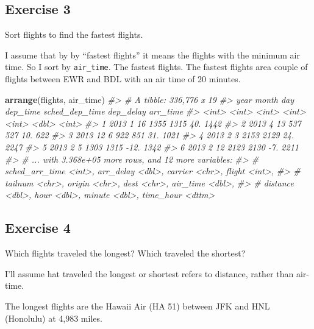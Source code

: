 \documentclass[]{book}
\newenvironment{Shaded}{\begin{snugshade}}{\end{snugshade}}
\newcommand{\CommentTok}[1]{\textcolor[rgb]{0.56,0.35,0.01}{\textit{#1}}}
\newcommand{\KeywordTok}[1]{\textcolor[rgb]{0.13,0.29,0.53}{\textbf{#1}}}
\newcommand{\NormalTok}[1]{#1}
\theoremstyle{definition}
\theoremstyle{definition}
\theoremstyle{definition}
\theoremstyle{remark}
\begin{document}
\hypertarget{exercise-3-2}{%
\subsection{Exercise 3}\label{exercise-3-2}}

Sort flights to find the fastest flights.

I assume that by by ``fastest flights'' it means the flights with the
minimum air time. So I sort by \texttt{air\_time}. The fastest flights.
The fastest flights area couple of flights between EWR and BDL with an
air time of 20 minutes.

\begin{Shaded}
\begin{Highlighting}[]
\KeywordTok{arrange}\NormalTok{(flights, air_time)}
\CommentTok{#> # A tibble: 336,776 x 19}
\CommentTok{#>    year month   day dep_time sched_dep_time dep_delay arr_time}
\CommentTok{#>   <int> <int> <int>    <int>          <int>     <dbl>    <int>}
\CommentTok{#> 1  2013     1    16     1355           1315       40.     1442}
\CommentTok{#> 2  2013     4    13      537            527       10.      622}
\CommentTok{#> 3  2013    12     6      922            851       31.     1021}
\CommentTok{#> 4  2013     2     3     2153           2129       24.     2247}
\CommentTok{#> 5  2013     2     5     1303           1315      -12.     1342}
\CommentTok{#> 6  2013     2    12     2123           2130       -7.     2211}
\CommentTok{#> # ... with 3.368e+05 more rows, and 12 more variables:}
\CommentTok{#> #   sched_arr_time <int>, arr_delay <dbl>, carrier <chr>, flight <int>,}
\CommentTok{#> #   tailnum <chr>, origin <chr>, dest <chr>, air_time <dbl>,}
\CommentTok{#> #   distance <dbl>, hour <dbl>, minute <dbl>, time_hour <dttm>}
\end{Highlighting}
\end{Shaded}

\hypertarget{exercise-4-1}{%
\subsection{Exercise 4}\label{exercise-4-1}}

Which flights traveled the longest? Which traveled the shortest?

I'll assume hat traveled the longest or shortest refers to distance,
rather than air-time.

The longest flights are the Hawaii Air (HA 51) between JFK and HNL
(Honolulu) at 4,983 miles.
\end{document}
